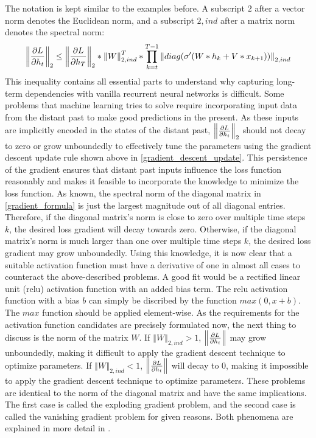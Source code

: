 \documentclass[draft,final]{vutinfth} %
\begin{document}
The notation is kept similar to the examples before. A subscript $2$ after a vector norm denotes the Euclidean norm, and a subscript $2,ind$ after a matrix norm denotes the spectral norm:
\begin{align}
\label{gradient_formula}
\left\Vert \pdv{L}{h_t} \right\Vert_2 \leq \left\Vert \pdv{L}{h_T} \right\Vert_2 * \left\Vert W \right\Vert_{2,ind}^T * \prod^{T-1}_{k=t} \left\Vert diag(\sigma'(W*h_k + V*x_{k+1})) \right\Vert_{2,ind}
\end{align}
This inequality contains all essential parts to understand why capturing long-term dependencies with vanilla recurrent neural networks is difficult.
Some problems that machine learning tries to solve require incorporating input data from the distant past to make good predictions in the present.
As these inputs are implicitly encoded in the states of the distant past, $\left\Vert \pdv{L}{h_t} \right\Vert_2$ should not decay to zero or grow unboundedly to effectively tune the parameters using the gradient descent update rule shown above in \ref{gradient_descent_update}.
This persistence of the gradient ensures that distant past inputs influence the loss function reasonably and makes it feasible to incorporate the knowledge to minimize the loss function.
As known, the spectral norm of the diagonal matrix in \ref{gradient_formula} is just the largest magnitude out of all diagonal entries.
Therefore, if the diagonal matrix's norm is close to zero over multiple time steps $k$, the desired loss gradient will decay towards zero.
Otherwise, if the diagonal matrix's norm is much larger than one over multiple time steps $k$, the desired loss gradient may grow unboundedly.
Using this knowledge, it is now clear that a suitable activation function must have a derivative of one in almost all cases to counteract the above-described problems.
A good fit would be a rectified linear unit (relu) activation function with an added bias term.
The relu activation function with a bias $b$ can simply be discribed by the function $max(0,x+b)$. The $max$ function should be applied element-wise.
As the requirements for the activation function candidates are precisely formulated now, the next thing to discuss is the norm of the matrix $W$.
If $\left\Vert W \right\Vert_{2,ind} > 1$, $\left\Vert \pdv{L}{h_t} \right\Vert$ may grow unboundedly, making it difficult to apply the gradient descent technique to optimize parameters.
If $\left\Vert W \right\Vert_{2,ind} < 1$, $\left\Vert \pdv{L}{h_t} \right\Vert$ will decay to $0$, making it impossible to apply the gradient descent technique to optimize parameters.
These problems are identical to the norm of the diagonal matrix and have the same implications.
The first case is called the exploding gradient problem, and the second case is called the vanishing gradient problem for given reasons.
Both phenomena are explained in more detail in \cite{LongTermDependenciesGradientDescent}.
\end{document}
